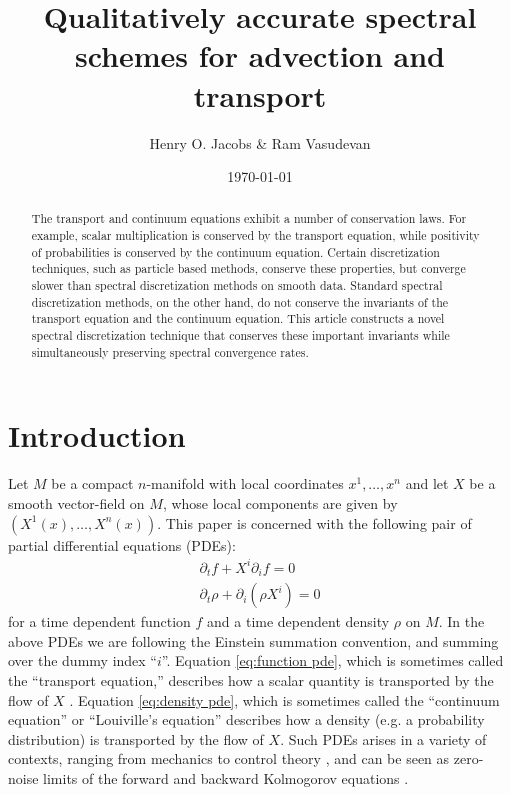 \documentclass[final,leqno]{siamltex1213}
\title{Qualitatively accurate spectral schemes for advection and transport}
\author{Henry O. Jacobs \& Ram Vasudevan}
\date{\today}
\begin{document}
\maketitle

\begin{abstract}
	The transport and continuum equations exhibit a number of conservation laws.
	For example, scalar multiplication is conserved by the transport equation, while
	positivity of probabilities is conserved by the continuum equation.
	Certain discretization techniques, such as particle based methods, conserve these properties, but converge slower than spectral discretization methods on smooth data.
	Standard spectral discretization methods, on the other hand, do not conserve the invariants of the transport equation and the continuum equation.
	This article constructs a novel spectral discretization technique that conserves these important invariants while simultaneously preserving spectral convergence rates. 
\end{abstract}

\section{Introduction}
\label{sec:intro}

Let $M$ be a compact $n$-manifold with local coordinates $x^{1},\dots,x^{n}$
and let $X$ be a smooth vector-field on $M$, whose local components are given by $(X^{1}(x), \dots, X^{n}(x) )$. 
This paper is concerned with the following pair of partial differential equations (PDEs):
\begin{align}
	\partial_{t} f + X^{i} \partial_{i} f = 0 \label{eq:function pde} \\
	\partial_{t} \rho + \partial_{i} (\rho X^{i}) = 0 \label{eq:density pde}
\end{align}
for a time dependent function $f$ and a time dependent density $\rho$ on $M$.
In the above PDEs we are following the Einstein summation convention, and summing over the dummy index ``$i$''.
Equation \eqref{eq:function pde}, which is sometimes called the ``transport equation,'' describes how a scalar quantity is transported by the flow of $X$ \cite{Truesdell1991}.
Equation \eqref{eq:density pde}, which is sometimes called the ``continuum equation'' or ``Louiville's equation'' describes how a density (e.g. a probability distribution) is transported by the flow of $X$.
Such PDEs arises in a variety of contexts, ranging from  mechanics \cite{Batchelor1999,Truesdell1991} to control theory \cite{HenrionKorda2014}, and can be seen as zero-noise limits of the forward and backward Kolmogorov equations \cite{Oksendal2003}.
\end{document}
